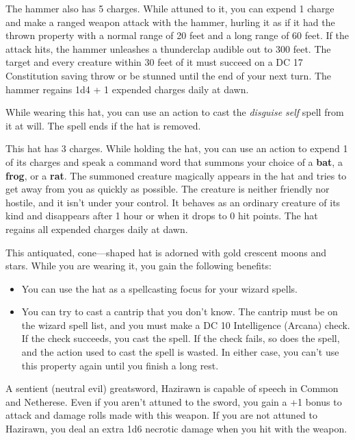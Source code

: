 \documentclass[10pt,a4paper,twoside,bg=print,twocolumn,openany,nodeprecatedcode]{dndbook}
\begin{document}
The hammer also has 5 charges. While attuned to it, you can expend 1 charge and make a ranged weapon attack with the hammer, hurling it as if it had the thrown property with a normal range of 20 feet and a long range of 60 feet. If the attack hits, the hammer unleashes a thunderclap audible out to 300 feet. The target and every creature within 30 feet of it must succeed on a DC 17 Constitution saving throw or be stunned until the end of your next turn. The hammer regains 1d4 + 1 expended charges daily at dawn.

While wearing this hat, you can use an action to cast the \textit{disguise self} spell from it at will. The spell ends if the hat is removed.

This hat has 3 charges. While holding the hat, you can use an action to expend 1 of its charges and speak a command word that summons your choice of a \textbf{bat}, a \textbf{frog}, or a \textbf{rat}. The summoned creature magically appears in the hat and tries to get away from you as quickly as possible. The creature is neither friendly nor hostile, and it isn't under your control. It behaves as an ordinary creature of its kind and disappears after 1 hour or when it drops to 0 hit points. The hat regains all expended charges daily at dawn.

This antiquated, cone—shaped hat is adorned with gold crescent moons and stars. While you are wearing it, you gain the following benefits:


\begin{itemize}
\item You can use the hat as a spellcasting focus for your wizard spells.
\item You can try to cast a cantrip that you don't know. The cantrip must be on the wizard spell list, and you must make a DC 10 Intelligence (Arcana) check. If the check succeeds, you cast the spell. If the check fails, so does the spell, and the action used to cast the spell is wasted. In either case, you can't use this property again until you finish a long rest.
\end{itemize}

A sentient (neutral evil) greatsword, Hazirawn is capable of speech in Common and Netherese. Even if you aren't attuned to the sword, you gain a +1 bonus to attack and damage rolls made with this weapon. If you are not attuned to Hazirawn, you deal an extra 1d6 necrotic damage when you hit with the weapon.
\end{document}
